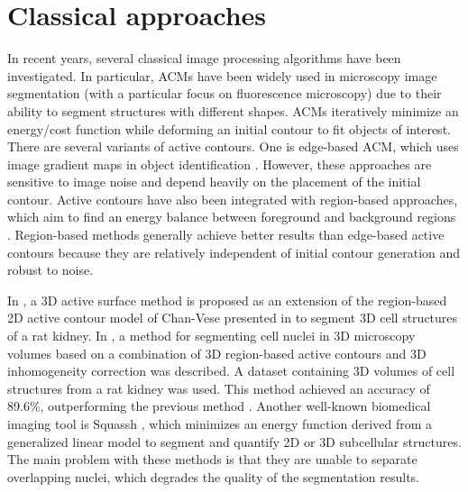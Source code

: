 \section{Classical approaches}
\label{subsection:clas}


In recent years, several classical image processing algorithms have been investigated. In particular, \ac{ACMs} have been widely used in microscopy image segmentation (with a particular focus on fluorescence microscopy) due to their ability to segment structures with different shapes. \ac{ACMs} iteratively minimize an energy/cost function while deforming an initial contour to fit objects of interest. There are several variants of active contours. One is edge-based \ac{ACM}, which uses image gradient maps in object identification \cite{snakes:active}. However, these approaches are sensitive to image noise and depend heavily on the placement of the initial contour. Active contours have also been integrated with region-based approaches, which aim to find an energy balance between foreground and background regions \cite{region:based}. Region-based methods generally achieve better results than edge-based active contours because they are relatively independent of initial contour generation and robust to noise. 


In \cite{3D:active}, a \ac{3D} active surface method is proposed as an extension of the region-based \ac{2D} active contour model of Chan-Vese presented in \cite{region:based} to segment \ac{3D} cell structures of a rat kidney. In \cite{active:inhmo}, a method for segmenting cell nuclei in \ac{3D} microscopy volumes based on a combination of \ac{3D} region-based active contours and \ac{3D} inhomogeneity correction was described. A dataset containing \ac{3D} volumes of cell structures from a rat kidney was used. This method achieved an accuracy of 89.6\%, outperforming the previous method \cite{region:based}. Another well-known biomedical imaging tool is Squassh \cite{squass:original,squassh}, which minimizes an energy function derived from a generalized linear model to segment and quantify \ac{2D} or \ac{3D} subcellular structures. The main problem with these methods is that they are unable to separate overlapping nuclei, which degrades the quality of the segmentation results. 

